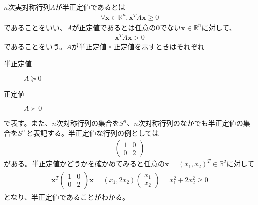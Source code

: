 $n$次実対称行列$A$が半正定値であるとは
\begin{align} \label{PSD}
  \forall \mathbf{x} \in \mathbb{R}^n, \mathbf{x}^T A \mathbf{x} \geq 0
\end{align}
であることをいい、$A$が正定値であるとは任意の$\mathbf{0}$でない$\mathbf{x} \in \mathbb{R}^n$に対して、
\begin{align} \label{PD}
  \mathbf{x}^T A \mathbf{x} > 0
\end{align}
であることをいう。$A$が半正定値・正定値を示すときはそれぞれ
\begin{description}
  \item[半正定値] $A \succeq 0$
  \item[正定値]   $A \succ 0$
\end{description}
で表す。また、$n$次対称行列の集合を$S^n$、$n$次対称行列のなかでも半正定値の集合を$S_+^n$と表記する。半正定値な行列の例としては
\begin{align*}
  \left(
    \begin{array}{cc}
      1 & 0 \\
      0 & 2
    \end{array}
  \right)
\end{align*}
がある。半正定値かどうかを確かめてみると任意の$\mathbf{x} = (x_1, x_2)^T \in \mathbb{R}^2$に対して
\begin{align*}
  \begin{array}{cc}
         \mathbf{x}^T
           \left(
             \begin{array}{cc}
               1 & 0 \\
               0 & 2
             \end{array}
           \right)
         \mathbf{x}
    =    (x_1, 2x_2)
           \left(
             \begin{array}{c}
               x_1 \\
               x_2
             \end{array}
           \right)
    =    x_1^2 + 2 x_2^2
    \geq 0
  \end{array}
\end{align*}
となり、半正定値であることがわかる。

